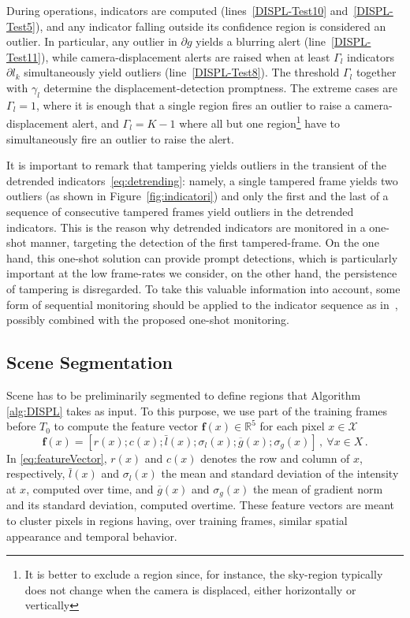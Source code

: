 \documentclass{llncs}
\begin{document}
During operations, indicators are computed (lines~\ref{DISPL-Test10} and~\ref{DISPL-Test5}), and any indicator falling outside its confidence region is considered an outlier. In particular, any outlier in $\partial g$ yields a blurring alert (line~\ref{DISPL-Test11}), while camera-displacement alerts are raised when at least $\Gamma_l$ indicators $\partial l_k$  simultaneously yield outliers (line~\ref{DISPL-Test8}). The threshold $\Gamma_l$ together with $\gamma_l$ determine the displacement-detection promptness. The extreme cases are $\Gamma_l = 1$, where it is enough that a single region fires an outlier to raise a camera-displacement alert, and $\Gamma_l = K-1$ where all but one region\footnote{It is better to exclude a region since, for instance, the sky-region typically does not change when the camera is displaced, either horizontally or vertically} have to simultaneously fire an outlier to raise the alert.

It is important to remark that tampering yields outliers in the transient of the detrended indicators~\eqref{eq:detrending}: namely, a single tampered frame yields two outliers (as shown in Figure~\ref{fig:indicatori}) and only the first and the last of a sequence of consecutive tampered frames yield outliers in the detrended indicators. This is the reason why detrended indicators are monitored in a one-shot manner, targeting the detection of the first tampered-frame. On the one hand, this one-shot solution can provide prompt detections, which is particularly important at the low frame-rates we consider, on the other hand, the persistence of tampering is disregarded. To take this valuable information into account, some form of sequential monitoring should be applied to the indicator sequence as in~\cite{alippi2010detecting}, possibly combined with the proposed one-shot monitoring.
%
%
\subsection{Scene Segmentation}\label{subsec:Segmentation}
Scene has to be preliminarily segmented to define regions that Algorithm \ref{alg:DISPL} takes as input. To this purpose, we use part of the training frames before $T_0$ to compute the feature vector $\textbf{f}(x)\in \mathbb{R}^5$ for each pixel $x\in\mathcal{X}$ 
\begin{equation}
\label{eq:featureVector}
\textbf{f}(x)=\left[r(x);c(x);\bar{l}(x);\sigma_{l}(x);\overline{g}(x);\sigma_{g}(x)\right]\,, \ \forall x \in X\,.
\end{equation}
In \eqref{eq:featureVector}, $r(x)$ and $c(x)$ denotes the row and column of $x$, respectively, $\bar{l}(x)$ and $\sigma_{l}(x)$ the mean and standard deviation of the intensity at $x$, computed over time, and $\overline{g}(x)$ and $\sigma_g(x)$ the mean of gradient norm and its standard deviation, computed overtime. These feature vectors are meant to cluster pixels in regions having, over training frames, similar spatial appearance and temporal behavior.
\end{document}
